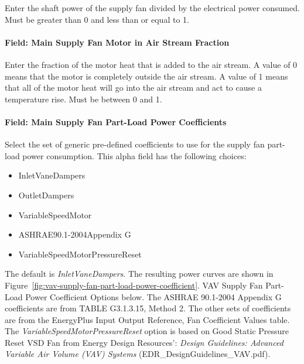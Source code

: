 Enter the shaft power of the supply fan divided by the electrical power consumed. Must be greater than 0 and less than or equal to 1.

\paragraph{Field: Main Supply Fan Motor in Air Stream Fraction}\label{field-main-supply-fan-motor-in-air-stream-fraction}

Enter the fraction of the motor heat that is added to the air stream. A value of 0 means that the motor is completely outside the air stream. A value of 1 means that all of the motor heat will go into the air stream and act to cause a temperature rise. Must be between 0 and 1.

\paragraph{Field: Main Supply Fan Part-Load Power Coefficients}\label{field-main-supply-fan-part-load-power-coefficients}

Select the set of generic pre-defined coefficients to use for the supply fan part-load power consumption. This alpha field has the following choices:

\begin{itemize}
\item
  InletVaneDampers
\item
  OutletDampers
\item
  VariableSpeedMotor
\item
  ASHRAE90.1-2004Appendix G
\item
  VariableSpeedMotorPressureReset
\end{itemize}

The default is \emph{InletVaneDampers}. The resulting power curves are shown in Figure~\ref{fig:vav-supply-fan-part-load-power-coefficient}. VAV Supply Fan Part-Load Power Coefficient Options below. The ASHRAE 90.1-2004 Appendix G coefficients are from TABLE G3.1.3.15, Method 2. The other sets of coefficients are from the EnergyPlus Input Output Reference, Fan Coefficient Values table. The \emph{VariableSpeedMotorPressureReset} option is based on Good Static Pressure Reset VSD Fan from Energy Design Resources': \emph{Design Guidelines: Advanced Variable Air Volume (VAV) Systems} (EDR\_DesignGuidelines\_VAV.pdf).

